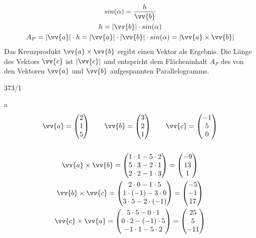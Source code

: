 \begin{gather*}
  sin(\alpha) = \frac{h}{\vv{b}} \\
  h = |\vv{b}| \cdot sin(\alpha) \\
  A_P = |\vv{a}| \cdot h = |\vv{a}| \cdot |\vv{b}| \cdot sin(\alpha) = |\vv{a} \times \vv{b}|
\end{gather*}
Das Kreuzprodukt $\vv{a} \times \vv{b}$ ergibt einen Vektor als Ergebnis. Die Länge des Vektors $\vv{c}$ ist $|\vv{c}|$ und entspricht dem Flächeninhalt $A_P$ des von den Vektoren $\vv{a}$ und $\vv{b}$ aufgespannten Parallelogramms.
\begin{exercise}{373/1}
  \item [a]
  \begin{gather*}
    \vv{a} = \begin{pmatrix}2 \\ 1 \\ 5\end{pmatrix} \qquad \vv{b} = \begin{pmatrix}3 \\ 2 \\ 1\end{pmatrix} \qquad \vv{c} = \begin{pmatrix}-1 \\ 5 \\ 0\end{pmatrix} \\\\
    \vv{a} \times \vv{b} = \begin{pmatrix}1 \cdot 1 - 5 \cdot 2 \\ 5 \cdot 3 - 2 \cdot 1 \\ 2 \cdot 2 - 1 \cdot 3\end{pmatrix} = \begin{pmatrix}-9 \\ 13 \\ 1\end{pmatrix} \\
    \vv{b} \times \vv{c} = \begin{pmatrix}2 \cdot 0 - 1 \cdot 5 \\ 1 \cdot (-1) - 3 \cdot 0 \\ 3 \cdot 5 - 2 \cdot (-1)\end{pmatrix} = \begin{pmatrix}-5 \\ -1 \\ 17\end{pmatrix} \\
    \vv{c} \times \vv{a} = \begin{pmatrix}5 \cdot 5 - 0 \cdot 1 \\ 0 \cdot 2 - (-1) \cdot 5 \\ -1 \cdot 1 - 5 \cdot 2\end{pmatrix} = \begin{pmatrix}25 \\ 5 \\ -11\end{pmatrix}
  \end{gather*}
\end{exercise}
